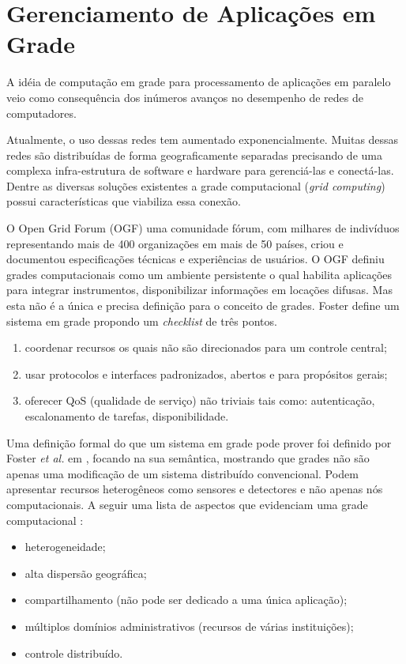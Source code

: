 \chapter{Gerenciamento de Aplicações em Grade}
\label{cap:gerenciamento}

A idéia de computação em grade para processamento de aplicações em paralelo veio como consequência dos inúmeros avanços no desempenho de redes de computadores.

Atualmente, o uso dessas redes tem aumentado exponencialmente. Muitas dessas redes são distribuídas de forma geograficamente separadas precisando de uma complexa infra-estrutura de software e hardware para gerenciá-las e conectá-las. Dentre as diversas soluções existentes a grade computacional (\emph{grid computing}) possui características que viabiliza essa conexão.

O Open Grid Forum (OGF) uma comunidade fórum, com milhares de indivíduos representando mais de 400 organizações em mais de 50 países, criou e documentou \cite{M.2002} especificações técnicas e experiências de usuários. O OGF definiu grades computacionais como um ambiente persistente o qual habilita aplicações para integrar instrumentos, disponibilizar informações em locações difusas. Mas esta não é a única e precisa definição para o conceito de grades. Foster \cite{Kesselman2001} define um sistema em grade propondo um \emph{checklist} de três pontos.

\begin{enumerate}
	\item coordenar recursos os quais não são direcionados para um controle central;
	\item usar protocolos e interfaces padronizados, abertos e para propósitos gerais;
	\item oferecer QoS (qualidade de serviço) não triviais tais como: autenticação, escalonamento de tarefas, disponibilidade.
\end{enumerate}

Uma definição formal do que um sistema em grade pode prover foi definido por Foster \emph{et al.} em \cite{Foster2002}, focando na sua semântica, mostrando que grades não são apenas uma modificação de um sistema distribuído convencional. Podem apresentar recursos heterogêneos como sensores e detectores e não apenas nós computacionais. A seguir uma lista de aspectos que evidenciam uma grade computacional \cite{Cirne2002}:

\begin{itemize}
	\item heterogeneidade;
	\item alta dispersão geográfica;
	\item compartilhamento (não pode ser dedicado a uma única aplicação);
	\item múltiplos domínios administrativos (recursos de várias instituições);
	\item controle distribuído.
\end{itemize}

